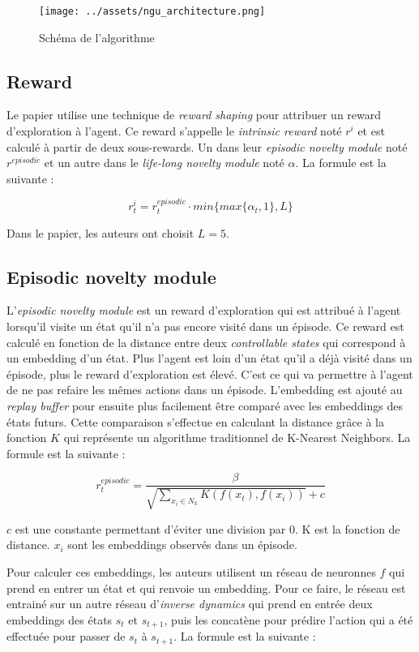 \begin{figure}[H]
    \centering
    \texttt{[image: ../assets/ngu\_architecture.png]}
    \caption{Schéma de l'algorithme }
\end{figure}

\subsection{Reward}

Le papier utilise une technique de \textit{reward shaping} pour attribuer un reward d'exploration à l'agent. Ce reward s'appelle le \textit{intrinsic reward} noté $r^i$ et est calculé à partir de deux sous-rewards. Un dans leur \textit{episodic novelty module} noté $r^{episodic}$ et un autre dans le \textit{life-long novelty module} noté $\alpha$. La formule est la suivante :

$$ r^i_t = r^{episodic}_t \cdot min \{ max \{ \alpha_t, 1 \}, L \} $$


Dans le papier, les auteurs ont choisit $L = 5$.

\subsection{Episodic novelty module}

L'\textit{episodic novelty module} est un reward d'exploration qui est attribué à l'agent lorsqu'il visite un état qu'il n'a pas encore visité dans un épisode. Ce reward est calculé en fonction de la distance entre deux \textit{controllable states} qui correspond à un embedding d'un état. Plus l'agent est loin d'un état qu'il a déjà visité dans un épisode, plus le reward d'exploration est élevé. C'est ce qui va permettre à l'agent de ne pas refaire les mêmes actions dans un épisode. L'embedding est ajouté au \textit{replay buffer} pour ensuite plus facilement être comparé avec les embeddings des états futurs.
Cette comparaison s'effectue en calculant la distance grâce à la fonction $K$ qui représente un algorithme traditionnel de K-Nearest Neighbors. La formule est la suivante :

$$ r^{episodic}_t = \frac{\beta}{\sqrt{\sum_{x_i \in N_k} K(f(x_t), f(x_i))} + c} $$

$c$ est une constante permettant d'éviter une division par 0. K est la fonction de distance. $x_i$ sont les embeddings observés dans un épisode.

Pour calculer ces embeddings, les auteurs utilisent un réseau de neuronnes $f$ qui prend en entrer un état et qui renvoie un embedding. Pour ce faire, le réseau est entrainé sur un autre réseau d'\textit{inverse dynamics} qui prend en entrée deux embeddings des états $s_t$ et $s_{t+1}$, puis les concatène pour prédire l'action qui a été effectuée pour passer de $s_t$ à $s_{t+1}$. La formule est la suivante :

